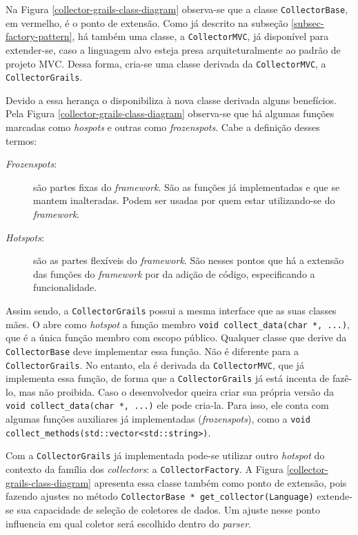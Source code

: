 Na Figura \ref{collector-grails-class-diagram} observa-se que a classe
\lstinline|CollectorBase|, em vermelho, é o ponto de extensão. Como já descrito
na subseção \ref{subsec-factory-pattern}, há também uma classe, a \lstinline|CollectorMVC|,
já disponível para extender-se, caso a linguagem alvo esteja presa
arquiteturalmente ao padrão de projeto MVC. Dessa forma, cria-se uma classe
derivada da \lstinline|CollectorMVC|, a \lstinline|CollectorGrails|.

Devido a essa herança o \framework disponibiliza à nova classe derivada
alguns benefícios. Pela Figura \ref{collector-grails-class-diagram} observa-se
que há algumas funções marcadas como \textit{hospots} e outras como 
\textit{frozenspots}. Cabe a definição desses termos:

\begin{description}
\item[\textit{Frozenspots}:] são partes fixas do \textit{framework}. São as funções já
implementadas e que se mantem inalteradas. Podem ser usadas por quem estar
utilizando-se do \textit{framework}.
\item[	\textit{Hotspots}:] são as partes flexíveis do \textit{framework}. São nesses
pontos que há a extensão das funções do \textit{framework} por da adição de
código, especificando a funcionalidade.
\end{description}

Assim sendo, a \lstinline|CollectorGrails| possui a mesma interface que as
suas classes mães. O \framework abre como \textit{hotspot} a função
membro \lstinline|void collect_data(char *, ...)|, que é a única função membro
com escopo público. Qualquer classe que derive da \lstinline|CollectorBase| deve
implementar essa função. Não é diferente para a \lstinline|CollectorGrails|. No
entanto, ela é derivada da \lstinline|CollectorMVC|, que já implementa essa
função, de forma que a \lstinline|CollectorGrails| já está incenta de fazê-lo, mas
não proibida. Caso o desenvolvedor queira criar sua própria versão da
\lstinline|void collect_data(char *, ...)| ele pode cria-la. Para isso, ele conta
com algumas funções auxiliares já implementadas (\textit{frozenspots}), como a
\lstinline|void collect_methods(std::vector<std::string>)|.

Com a \lstinline|CollectorGrails| já implementada pode-se utilizar outro
\textit{hotspot} do contexto da família dos \textit{collectors}: a
\lstinline|CollectorFactory|. A Figura \ref{collector-grails-class-diagram}
apresenta essa classe também como ponto de extensão, pois fazendo ajustes no
método \lstinline|CollectorBase * get_collector(Language)| extende-se sua
capacidade de seleção de coletores de dados. Um ajuste nesse ponto influencia
em qual coletor será escolhido dentro do \textit{parser}.

